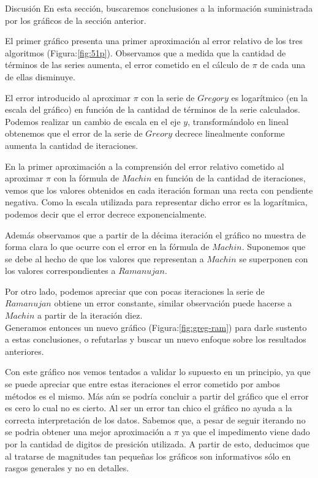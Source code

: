 \begin{section}{Discusión}
	En esta sección, buscaremos conclusiones a la información suministrada por los gráficos de la sección anterior.
	
	El primer gráfico presenta una primer aproximación al error relativo de los tres algoritmos (Figura:\ref{fig:51p}).
	Observamos que a medida que la cantidad de términos de las series aumenta, el error cometido en el cálculo de $\pi$ de cada una de ellas disminuye.
	
	El error introducido al aproximar $\pi$ con la serie de $Gregory$ es logarítmico (en la escala del gráfico) en función de la cantidad de términos de la serie calculados. Podemos realizar un cambio de escala en el eje $y$, transformándolo en lineal obtenemos que el error de la serie de $Greory$ decrece linealmente conforme aumenta la cantidad de iteraciones.
	
	En la primer aproximación a la comprensión del error relativo cometido al aproximar $\pi$ con la fórmula de $Machin$ en función de la cantidad de iteraciones, vemos que los valores obtenidos en cada iteración forman una recta con pendiente negativa. Como la escala utilizada para representar dicho error es la logarítmica, podemos decir que el error decrece exponencialmente.
	
	Además observamos que a partir de la décima iteración el gráfico no muestra de forma clara lo que ocurre con el error en la fórmula de $Machin$. Suponemos que se debe al hecho de que los valores que representan a $Machin$ se superponen con los valores correspondientes a $Ramanujan$.
	
	Por otro lado, podemos apreciar que con pocas iteraciones la serie de $Ramanujan$ obtiene un error constante, similar observación puede hacerse a $Machin$ a partir de la iteración diez.\\
	
	Generamos entonces un nuevo gráfico (Figura:\ref{fig:greg-ram}) para darle sustento a estas conclusiones, o refutarlas y buscar un nuevo enfoque sobre los resultados anteriores.

	Con este gráfico nos vemos tentados a validar lo supuesto en un principio, ya que se puede apreciar que entre estas iteraciones el error cometido por ambos métodos es el mismo. Más aún se podría concluir a partir del gráfico que el error es cero lo cual no es cierto. Al ser un error tan chico el gráfico no ayuda a la correcta interpretación de los datos. Sabemos que, a pesar de seguir iterando no se podria obtener una mejor aproximación a $\pi$ ya que el impedimento viene dado por la cantidad de digitos de presición utilizada.
	A partir de esto, deducimos que al tratarse de magnitudes tan pequeñas los gráficos son informativos sólo en rasgos generales y no en detalles.\\	


\end{section}
